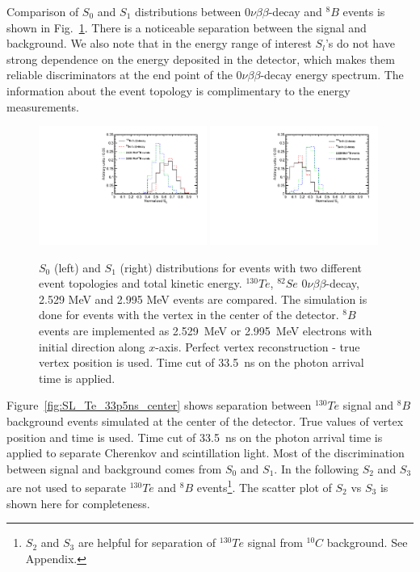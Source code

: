 \documentclass[12pt,twoside,letterpaper]{article}
\newcommand{\vbb}{0\nu\beta\beta}
\newcommand{\Te}{^{130}Te}
\newcommand{\B}{^{8}B}
\newcommand{\Cten}{^{10}C}
\begin{document}
Comparison of $S_0$ and $S_1$ distributions between $\vbb$-decay and $\B$ events is shown in Fig.~\ref{fig:S_vs_energy}. There is a noticeable separation between the signal and background. We also note that in the energy range of interest $S_l$'s do not have strong dependence on the energy deposited in the detector, which makes them reliable discriminators at the end point of the $\vbb$-decay energy spectrum. The information about the event topology is complimentary to the energy measurements.

\begin{figure}[htb]
\centering
\includegraphics[angle=0,width=0.49\textwidth]{plots/hS0.pdf}
\includegraphics[angle=0,width=0.49\textwidth]{plots/hS1.pdf}
\caption{$S_0$ (left) and $S_1$ (right) distributions for events with two different event topologies and total kinetic energy. $^{130}Te$, $^{82}Se$ $\vbb$-decay, 2.529 MeV and 2.995 MeV events are compared. The simulation is done for events with the vertex in the center of the detector. $\B$ events are implemented as 2.529~MeV or 2.995~MeV electrons with initial direction along $x$-axis. Perfect vertex reconstruction - true vertex position is used. Time cut of 33.5~ns on the photon arrival time is applied.}
\label{fig:S_vs_energy}
\end{figure}


Figure~\ref{fig:SL_Te_33p5ns_center} shows separation between $\Te$ signal and $\B$ background events simulated at the center of the detector. True values of vertex position and time is used. Time cut of 33.5~ns on the photon arrival time is applied to separate Cherenkov and scintillation light. Most of the discrimination between signal and background comes from $S_0$ and $S_1$. In the following $S_2$ and $S_3$ are not used to separate $\Te$ and $\B$ events\footnote{$S_2$ and $S_3$ are helpful for separation of $\Te$ signal from $\Cten$ background. See Appendix.}. The scatter plot of $S_2$ vs $S_3$ is shown here for completeness. 
\end{document}
